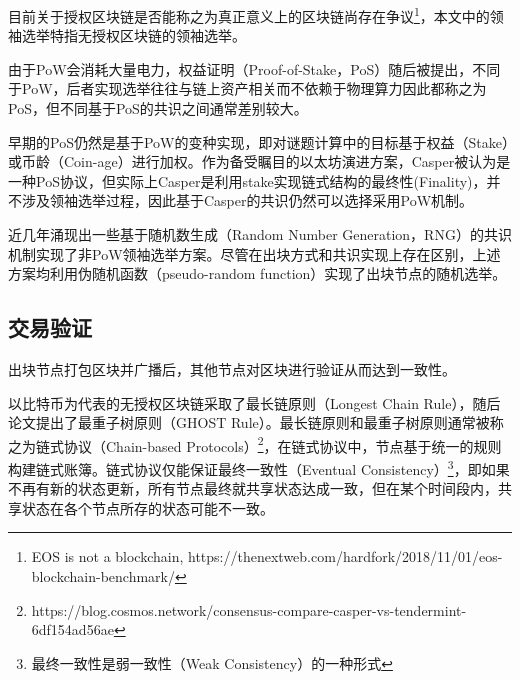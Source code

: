 目前关于授权区块链是否能称之为真正意义上的区块链尚存在争议\footnote{EOS is not a blockchain, https://thenextweb.com/hardfork/2018/11/01/eos-blockchain-benchmark/}，本文中的领袖选举特指无授权区块链的领袖选举。

由于PoW会消耗大量电力，权益证明（Proof-of-Stake，PoS）随后被提出，不同于PoW，后者实现选举往往与链上资产相关而不依赖于物理算力因此都称之为PoS，但不同基于PoS的共识之间通常差别较大。

早期的PoS仍然是基于PoW的变种实现\cite{king2012ppcoin}，即对谜题计算中的目标基于权益（Stake）或币龄（Coin-age）进行加权。作为备受瞩目的以太坊演进方案，Casper\cite{buterin2017casper}被认为是一种PoS协议，但实际上Casper是利用stake实现链式结构的最终性(Finality)，并不涉及领袖选举过程，因此基于Casper的共识仍然可以选择采用PoW机制。


近几年涌现出一些基于随机数生成（Random Number Generation，RNG）的共识机制实现了非PoW领袖选举方案\cite{gilad2017algorand,david2018ouroboros,hanke2018difinity}。尽管在出块方式和共识实现上存在区别，上述方案均利用伪随机函数（pseudo-random function）实现了出块节点的随机选举。


\subsection{交易验证}
\label{subsec:intro_tx_verification}
出块节点打包区块并广播后，其他节点对区块进行验证从而达到一致性。

以比特币为代表的无授权区块链采取了最长链原则（Longest Chain Rule）\cite{nakamoto2008bitcoin}，随后论文\cite{sompolinsky2015secure}提出了最重子树原则（GHOST Rule）。最长链原则和最重子树原则通常被称之为链式协议（Chain-based Protocols）\footnote{https://blog.cosmos.network/consensus-compare-casper-vs-tendermint-6df154ad56ae}，在链式协议中，节点基于统一的规则构建链式账簿。链式协议仅能保证最终一致性（Eventual Consistency）\footnote{最终一致性是弱一致性（Weak Consistency）的一种形式}，即如果不再有新的状态更新，所有节点最终就共享状态达成一致，但在某个时间段内，共享状态在各个节点所存的状态可能不一致\cite{brewer2000towards}。

